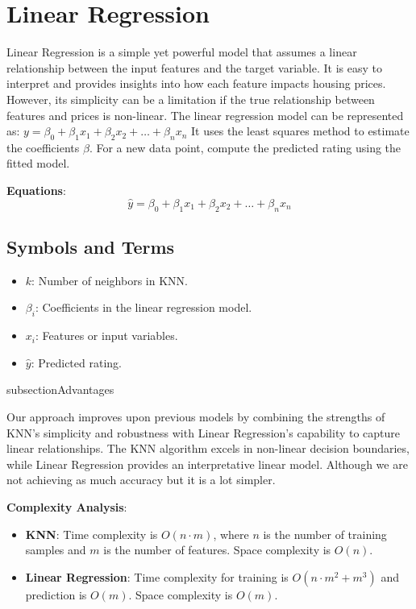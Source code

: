\documentclass[10pt,conference,compsoc]{IEEEtran}
\begin{document}
{\section{Linear Regression}
Linear Regression is a simple yet powerful model that assumes a linear relationship between the input features and the target variable. It is easy to interpret and provides insights into how each feature impacts housing prices. However, its simplicity can be a limitation if the true relationship between features and prices is non-linear.
The linear regression model can be represented as:
 \( y = \beta_0 + \beta_1x_1 + \beta_2x_2 + \ldots + \beta_nx_n \)
It uses the least squares method to estimate the coefficients \( \beta \).
For a new data point, compute the predicted rating using the fitted model.

\textbf{Equations}:
\[
\hat{y} = \beta_0 + \beta_1x_1 + \beta_2x_2 + \ldots + \beta_nx_n
\]

\subsection{Symbols and Terms}

\begin{itemize}
    \item \( k \): Number of neighbors in KNN.
    \item \( \beta_i \): Coefficients in the linear regression model.
    \item \( x_i \): Features or input variables.
    \item \( \hat{y} \): Predicted rating.
\end{itemize}

subsection{Advantages }

Our approach improves upon previous models by combining the strengths of KNN's simplicity and robustness with Linear Regression's capability to capture linear relationships. The KNN algorithm excels in non-linear decision boundaries, while Linear Regression provides an interpretative linear model. Although we are not achieving as much accuracy but it is a lot simpler.

\textbf{Complexity Analysis}:
\begin{itemize}
    \item \textbf{KNN}: Time complexity is \( O(n \cdot m) \), where \( n \) is the number of training samples and \( m \) is the number of features. Space complexity is \( O(n) \).
    \item \textbf{Linear Regression}: Time complexity for training is \( O(n \cdot m^2 + m^3) \) and prediction is \( O(m) \). Space complexity is \( O(m) \).
\end{itemize}

}
\end{document}

